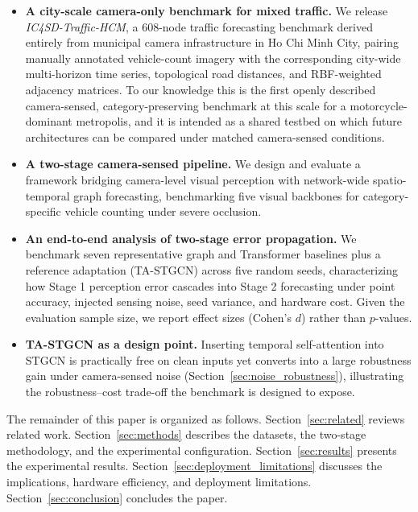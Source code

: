 \documentclass[preprint,12pt]{elsarticle}
\begin{document}
\begin{itemize}
    \item \textbf{A city-scale camera-only benchmark for mixed traffic.} We release \emph{IC4SD-Traffic-HCM}, a 608-node traffic forecasting benchmark derived entirely from municipal camera infrastructure in Ho Chi Minh City, pairing manually annotated vehicle-count imagery with the corresponding city-wide multi-horizon time series, topological road distances, and RBF-weighted adjacency matrices. To our knowledge this is the first openly described camera-sensed, category-preserving benchmark at this scale for a motorcycle-dominant metropolis, and it is intended as a shared testbed on which future architectures can be compared under matched camera-sensed conditions.
    \item \textbf{A two-stage camera-sensed pipeline.} We design and evaluate a framework bridging camera-level visual perception with network-wide spatio-temporal graph forecasting, benchmarking five visual backbones for category-specific vehicle counting under severe occlusion.
    \item \textbf{An end-to-end analysis of two-stage error propagation.} We benchmark seven representative graph and Transformer baselines plus a reference adaptation (TA-STGCN) across five random seeds, characterizing how Stage 1 perception error cascades into Stage 2 forecasting under point accuracy, injected sensing noise, seed variance, and hardware cost. Given the evaluation sample size, we report effect sizes (Cohen's $d$) rather than $p$-values.
    \item \textbf{TA-STGCN as a design point.} Inserting temporal self-attention into STGCN is practically free on clean inputs yet converts into a large robustness gain under camera-sensed noise (Section~\ref{sec:noise_robustness}), illustrating the robustness--cost trade-off the benchmark is designed to expose.
\end{itemize}

The remainder of this paper is organized as follows. Section~\ref{sec:related} reviews related work. Section~\ref{sec:methods} describes the datasets, the two-stage methodology, and the experimental configuration. Section~\ref{sec:results} presents the experimental results. Section~\ref{sec:deployment_limitations} discusses the implications, hardware efficiency, and deployment limitations. Section~\ref{sec:conclusion} concludes the paper.

\end{document}
